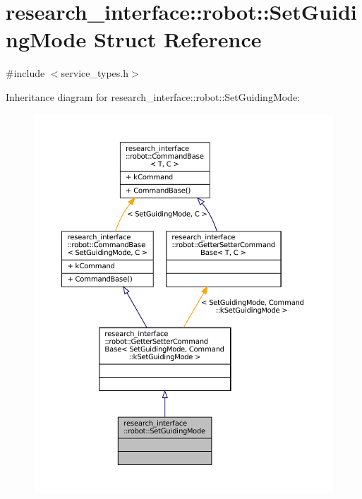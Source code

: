 \hypertarget{structresearch__interface_1_1robot_1_1SetGuidingMode}{}\section{research\+\_\+interface\+:\+:robot\+:\+:Set\+Guiding\+Mode Struct Reference}
\label{structresearch__interface_1_1robot_1_1SetGuidingMode}


{\ttfamily \#include $<$service\+\_\+types.\+h$>$}



Inheritance diagram for research\+\_\+interface\+:\+:robot\+:\+:Set\+Guiding\+Mode\+:
\nopagebreak
\begin{figure}[H]
\begin{center}
\leavevmode
\includegraphics[width=350pt]{structresearch__interface_1_1robot_1_1SetGuidingMode__inherit__graph}
\end{center}
\end{figure}


